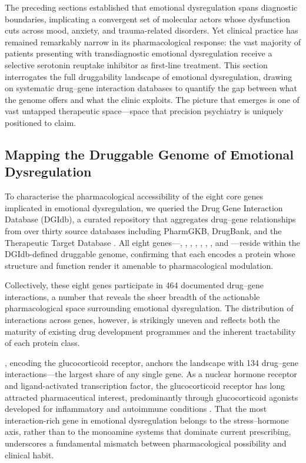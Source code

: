 

The preceding sections established that emotional dysregulation spans
diagnostic boundaries, implicating a convergent set of molecular actors whose
dysfunction cuts across mood, anxiety, and trauma-related disorders. Yet
clinical practice has remained remarkably narrow in its pharmacological
response: the vast majority of patients presenting with transdiagnostic
emotional dysregulation receive a selective serotonin reuptake inhibitor as
first-line treatment. This section interrogates the full druggability landscape
of emotional dysregulation, drawing on systematic drug--gene interaction
databases to quantify the gap between what the genome offers and what the
clinic exploits. The picture that emerges is one of vast untapped therapeutic
space---space that precision psychiatry is uniquely positioned to claim.

\subsection*{Mapping the Druggable Genome of Emotional Dysregulation}

To characterise the pharmacological accessibility of the eight core genes
implicated in emotional dysregulation, we queried the Drug Gene Interaction
Database (DGIdb), a curated repository that aggregates drug--gene relationships
from over thirty source databases including PharmGKB, DrugBank, and the
Therapeutic Target Database \cite{freshour2021}. All eight genes---,
, , , , ,
, and ---reside within the DGIdb-defined druggable
genome, confirming that each encodes a protein whose structure and function
render it amenable to pharmacological modulation.

Collectively, these eight genes participate in 464 documented drug--gene
interactions, a number that reveals the sheer breadth of the actionable
pharmacological space surrounding emotional dysregulation. The distribution of
interactions across genes, however, is strikingly uneven and reflects both the
maturity of existing drug development programmes and the inherent tractability
of each protein class.

, encoding the glucocorticoid receptor, anchors the landscape with
134 drug--gene interactions---the largest share of any single gene. As a nuclear
hormone receptor and ligand-activated transcription factor, the glucocorticoid
receptor has long attracted pharmaceutical interest, predominantly through
glucocorticoid agonists developed for inflammatory and autoimmune conditions
\cite{oakley2013}. That the most interaction-rich gene in emotional
dysregulation belongs to the stress--hormone axis, rather than to the monoamine
systems that dominate current prescribing, underscores a fundamental mismatch
between pharmacological possibility and clinical habit.

